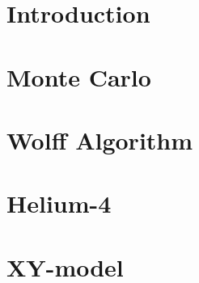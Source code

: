 \documentclass[a4paper]{article}
\begin{document}
\section{Introduction}
\section{Monte Carlo}
\section{Wolff Algorithm}
\section{Helium-4}
\section{XY-model}
\end{document}
